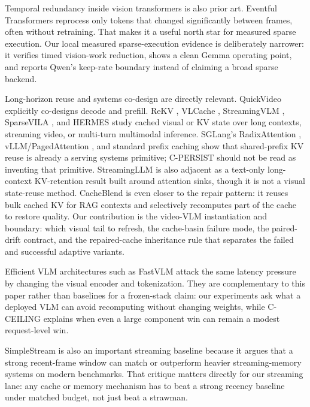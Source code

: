 Temporal redundancy inside vision transformers is also prior art. Eventful
Transformers \cite{eventful} reprocess only tokens that changed significantly
between frames, often without retraining. That makes it a useful north star for
measured sparse execution. Our local measured sparse-execution evidence is
deliberately narrower: it verifies timed vision-work reduction, shows a clean
Gemma operating point, and reports Qwen's keep-rate boundary instead of
claiming a broad sparse backend.

Long-horizon reuse and systems co-design are directly relevant. QuickVideo
\cite{quickvideo} explicitly co-designs decode and prefill. ReKV \cite{rekv},
VLCache \cite{vlcache}, StreamingVLM \cite{streamingvlm}, SparseVILA
\cite{sparsevila}, and HERMES \cite{hermes} study cached visual or KV state
over long contexts, streaming video, or multi-turn multimodal inference.
SGLang's RadixAttention \cite{sglang}, vLLM/PagedAttention \cite{vllm}, and
standard prefix caching show that shared-prefix KV reuse is already a serving
systems primitive; C-PERSIST should not be read as inventing that primitive.
StreamingLLM \cite{streamingllm} is also adjacent as a text-only long-context
KV-retention result built around attention sinks, though it is not a visual
state-reuse method.
CacheBlend \cite{cacheblend} is even closer to the repair pattern: it reuses
bulk cached KV for RAG contexts and selectively recomputes part of the cache to
restore quality. Our contribution is the video-VLM instantiation and boundary:
which visual tail to refresh, the cache-basin failure mode, the paired-drift
contract, and the repaired-cache inheritance rule that separates the failed and
successful adaptive variants.

Efficient VLM architectures such as FastVLM \cite{fastvlm} attack the same
latency pressure by changing the visual encoder and tokenization. They are
complementary to this paper rather than baselines for a frozen-stack claim:
our experiments ask what a deployed VLM can avoid recomputing without changing
weights, while C-CEILING explains when even a large component win can remain a
modest request-level win.

SimpleStream \cite{simplestream} is also an important streaming baseline
because it argues that a strong recent-frame window can match or outperform
heavier streaming-memory systems on modern benchmarks. That critique matters
directly for our streaming lane: any cache or memory mechanism has to beat a
strong recency baseline under matched budget, not just beat a strawman.

